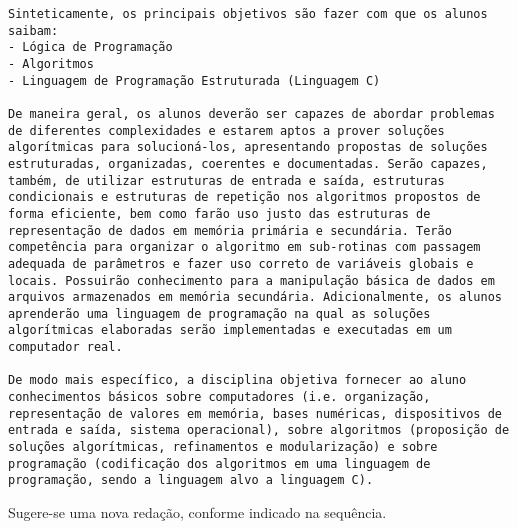 \documentclass[12pt, oneside]{book}
\begin{document}
\begin{lstlisting}
Sinteticamente, os principais objetivos são fazer com que os alunos saibam:
- Lógica de Programação
- Algoritmos
- Linguagem de Programação Estruturada (Linguagem C)

De maneira geral, os alunos deverão ser capazes de abordar problemas de diferentes complexidades e estarem aptos a prover soluções algorítmicas para solucioná-los, apresentando propostas de soluções estruturadas, organizadas, coerentes e documentadas. Serão capazes, também, de utilizar estruturas de entrada e saída, estruturas condicionais e estruturas de repetição nos algoritmos propostos de forma eficiente, bem como farão uso justo das estruturas de representação de dados em memória primária e secundária. Terão competência para organizar o algoritmo em sub-rotinas com passagem adequada de parâmetros e fazer uso correto de variáveis globais e locais. Possuirão conhecimento para a manipulação básica de dados em arquivos armazenados em memória secundária. Adicionalmente, os alunos aprenderão uma linguagem de programação na qual as soluções algorítmicas elaboradas serão implementadas e executadas em um computador real.

De modo mais específico, a disciplina objetiva fornecer ao aluno conhecimentos básicos sobre computadores (i.e. organização, representação de valores em memória, bases numéricas, dispositivos de entrada e saída, sistema operacional), sobre algoritmos (proposição de soluções algorítmicas, refinamentos e modularização) e sobre programação (codificação dos algoritmos em uma linguagem de programação, sendo a linguagem alvo a linguagem C).
\end{lstlisting}

Sugere-se uma nova redação, conforme indicado na sequência.
\end{document}

